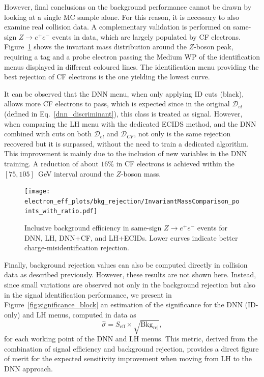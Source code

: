 However, final conclusions on the background performance cannot be drawn by looking at a single MC sample alone. For this reason, it is necessary to also examine real collision data. A complementary validation is performed on same-sign $Z\to e^{+}e^{-}$ events in data, which are largely populated by CF electrons. Figure~\ref{fig:cf_bkg_data} shows the invariant mass distribution around the $Z$-boson peak, requiring a tag and a probe electron passing the Medium WP of the identification menus displayed in different coloured lines. The identification menu providing the best rejection of CF electrons is the one yielding the lowest curve. 

It can be observed that the DNN menu, when only applying ID cuts (black), allows more CF electrons to pass, which is expected since in the original $\mathcal{D}_{el}$ (defined in Eq.~\ref{dnn_discriminant}), this class is treated as signal. However, when comparing the LH menu with the dedicated ECIDS method, and the DNN combined with cuts on both $\mathcal{D}_{el}$ and $\mathcal{D}_{CF}$, not only is the same rejection recovered but it is surpassed, without the need to train a dedicated algorithm. This improvement is mainly due to the inclusion of new variables in the DNN training. A reduction of about $16\%$ in CF electrons is achieved within the $[75,105]$~GeV interval around the $Z$-boson mass.

\begin{figure}[htbp]
  \centering
  \texttt{[image: electron\_eff\_plots/bkg\_rejection/InvariantMassComparison\_points\_with\_ratio.pdf]}
  \caption{Inclusive background efficiency in same-sign $Z\to e^{+}e^{-}$ events for DNN, LH, DNN+CF, and LH+ECIDs. Lower curves indicate better charge-misidentification rejection.}
  \label{fig:cf_bkg_data}
\end{figure}

Finally, background rejection values can also be computed directly in collision data as described previously. However, these results are not shown here. Instead, since small variations are observed not only in the background rejection but also in the signal identification performance, we present in Figure~\ref{fig:significance_block} an estimation of the significance for the DNN (ID-only) and LH menus, computed in data as
\begin{equation}
\hat{\sigma} = S_{\mathrm{eff}} \times \sqrt{\mathrm{Bkg}_{\mathrm{rej}}},
\end{equation}
for each working point of the DNN and LH menus. This metric, derived from the combination of signal efficiency and background rejection, provides a direct figure of merit for the expected sensitivity improvement when moving from LH to the DNN approach.



